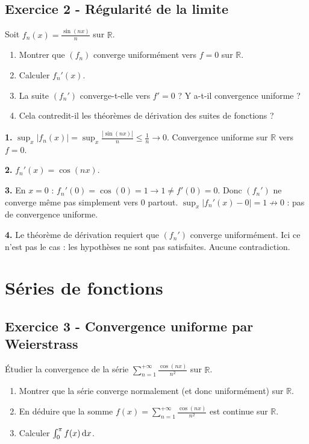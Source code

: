 \documentclass[12pt,a4paper]{article}
\begin{document}
\subsection*{Exercice 2 - Régularité de la limite \niveau{\moyen}}

\begin{boiteexercice}
Soit $f_n(x) = \frac{\sin(nx)}{n}$ sur $\mathbb{R}$.
\begin{enumerate}
  \item Montrer que $(f_n)$ converge uniformément vers $f=0$ sur $\mathbb{R}$.
  \item Calculer $f_n'(x)$.
  \item La suite $(f_n')$ converge-t-elle vers $f'=0$ ? Y a-t-il convergence uniforme ?
  \item Cela contredit-il les théorèmes de dérivation des suites de fonctions ?
\end{enumerate}
\end{boiteexercice}

\begin{boitecorrige}
\textbf{1.} $\sup_x|f_n(x)| = \sup_x\frac{|\sin(nx)|}{n} \leq \frac{1}{n}\to0$. Convergence uniforme sur $\mathbb{R}$ vers $f=0$.

\textbf{2.} $f_n'(x) = \cos(nx)$.

\textbf{3.} En $x=0$ : $f_n'(0)=\cos(0)=1\to1\neq f'(0)=0$. Donc $(f_n')$ ne converge même pas simplement vers $0$ partout. $\sup_x|f_n'(x)-0|=1\not\to0$ : pas de convergence uniforme.

\textbf{4.} Le théorème de dérivation requiert que $(f_n')$ converge uniformément. Ici ce n'est pas le cas : les hypothèses ne sont pas satisfaites. Aucune contradiction.
\end{boitecorrige}

\section{Séries de fonctions}

\subsection*{Exercice 3 - Convergence uniforme par Weierstrass \niveau{\moyen}}

\begin{boiteexercice}
Étudier la convergence de la série $\displaystyle\sum_{n=1}^{+\infty}\frac{\cos(nx)}{n^2}$ sur $\mathbb{R}$.
\begin{enumerate}
  \item Montrer que la série converge normalement (et donc uniformément) sur $\mathbb{R}$.
  \item En déduire que la somme $f(x)=\sum_{n=1}^{+\infty}\frac{\cos(nx)}{n^2}$ est continue sur $\mathbb{R}$.
  \item Calculer $\int_0^\pi f(x)\,\mathrm{d} x$.
\end{enumerate}
\end{boiteexercice}
\end{document}
